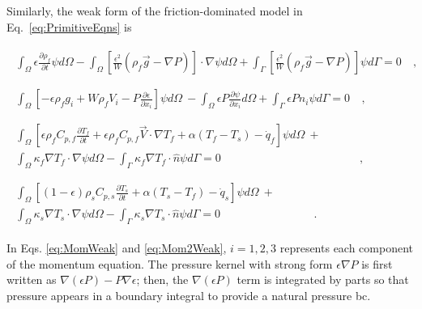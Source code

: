 \noindent Similarly, the weak form of the friction-dominated model in Eq.\ \eqref{eq:PrimitiveEqns} is

\begin{subequations}
\label{eq:PrimitiveWeakForms}
\begin{align}
\label{eq:Mass2Weak}
\begin{split}
\int_\Omega\epsilon\frac{\partial\rho_f}{\partial t}\psi d\Omega-\int_\Omega\left\lbrack\frac{\epsilon^2}{W}\left(\rho_f\vec{g}-\nabla P\right)\right\rbrack\cdot\nabla\psi d\Omega+\int_\Gamma\left\lbrack\frac{\epsilon^2}{W}\left(\rho_f\vec{g}-\nabla P\right)\right\rbrack \psi d\Gamma=0&\ ,\\
&
\end{split}\\
%
%
\label{eq:Mom2Weak}
\begin{split}\int_\Omega\left\lbrack-\epsilon\rho_f g_i+W\rho_fV_i-P\frac{\partial\epsilon}{\partial x_i}\right\rbrack\psi d\Omega\ -\int_\Omega \epsilon P\frac{\partial\psi}{\partial x_i}d\Omega+\int_\Gamma\epsilon Pn_i\psi d\Gamma=0&\ ,\\
&
\end{split}\\
%
%
\label{eq:Energy2Weak}
\begin{split}
\int_\Omega\left\lbrack\epsilon\rho_fC_{p,f}\frac{\partial T_f}{\partial t}+\epsilon\rho_fC_{p,f}\vec{V}\cdot\nabla T_f+\alpha(T_f-T_s)-\dot{q}_f\right\rbrack\psi d\Omega\ +\hspace{1cm}\\
\int_\Omega\kappa_f\nabla T_f\cdot\nabla \psi d\Omega-\int_\Gamma\kappa_f\nabla T_f\cdot\hat{n}\psi d\Gamma=0&\ ,\\
&
\end{split}\\
%
%
\label{eq:PrimitiveEnergyWeak}
\begin{split}\int_\Omega\left\lbrack(1-\epsilon)\rho_sC_{p,s}\frac{\partial T_s}{\partial t}+\alpha(T_s-T_f)-\dot{q}_s\right\rbrack\psi d\Omega\ +\hspace{1cm}\\
\int_\Omega\kappa_s\nabla T_s\cdot\nabla\psi d\Omega-\int_\Gamma\kappa_s\nabla T_s\cdot\hat{n}\psi d\Gamma=0&\ .\end{split}
\end{align}
\end{subequations}

\noindent In Eqs. \eqref{eq:MomWeak} and \eqref{eq:Mom2Weak}, \(i=1,2,3\) represents each component of the momentum equation. The pressure kernel with strong form \(\epsilon\nabla P\) is first written as \(\nabla(\epsilon P)-P\nabla\epsilon\); then, the \(\nabla(\epsilon P)\) term is integrated by parts so that pressure appears in a boundary integral to provide a natural pressure \gls{bc}. 

